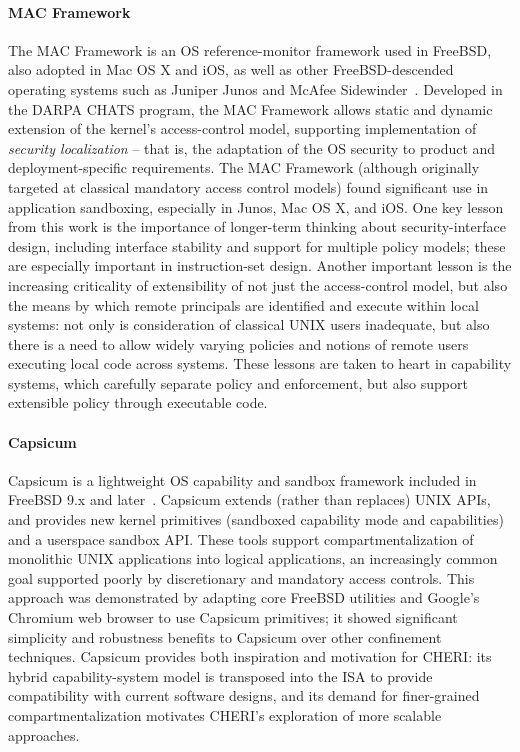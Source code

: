 \paragraph{MAC Framework} %
The MAC Framework is an OS reference-monitor framework used in FreeBSD, also
adopted in Mac OS X and iOS, as well as other FreeBSD-descended operating
systems such as Juniper Junos and McAfee Sidewinder~\cite{watson13}.
Developed in the DARPA CHATS program, the MAC Framework allows static and
dynamic extension of the kernel's access-control model, supporting
implementation of {\em security localization} --
that is,  
the adaptation of the OS
security to product and deployment-specific requirements.
The MAC Framework (although originally targeted at classical mandatory access
control models) found significant use in application sandboxing, especially in
Junos, Mac OS X, and iOS.
One key lesson from this work is the importance of longer-term thinking about
security-interface design, 
including
interface stability and
support for multiple policy models; these are especially important in
instruction-set design.
Another important lesson is the increasing criticality of extensibility of not
just the access-control model, but also the means by which remote principals
are identified and execute within local systems: 
not only is consideration of classical UNIX users inadequate, 
but also there is a need to allow widely varying policies and
notions of remote users executing local code across systems.
These lessons are taken to heart in capability systems, which carefully
separate policy and enforcement, but also support extensible policy through
executable code.

\paragraph{Capsicum} %
Capsicum is a lightweight OS capability and sandbox framework included in
FreeBSD 9.x and later~\cite{Watson10,Watson10a}.
Capsicum extends (rather than replaces) UNIX APIs, and
provides new kernel primitives
(sandboxed capability mode and capabilities) and a userspace sandbox
API.
These tools support compartmentalization of monolithic UNIX applications
into logical applications, an increasingly common goal supported poorly by
discretionary and mandatory access controls.
This approach was demonstrated by adapting core FreeBSD utilities and
Google's Chromium web browser to use Capsicum primitives; it showed
significant simplicity and robustness benefits to Capsicum over other
confinement techniques.
Capsicum provides both inspiration and motivation for CHERI: its hybrid
capability-system model is transposed into the ISA to provide
compatibility with current software designs, and its demand for finer-grained
compartmentalization motivates CHERI's exploration of more scalable
approaches.

